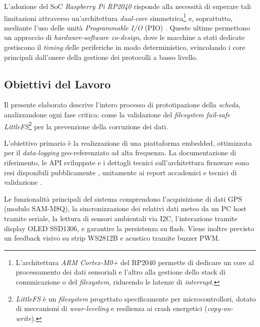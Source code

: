 L'adozione del SoC \textit{Raspberry Pi RP2040} \cite{rp2040_ds} risponde alla necessità di superare tali limitazioni attraverso un'architettura \textit{dual-core} simmetrica\footnote{L'architettura \textit{ARM Cortex-M0+} del RP2040 permette di dedicare un core al processamento dei dati sensoriali e l'altro alla gestione dello stack di comunicazione o del \textit{filesystem}, riducendo le latenze di \textit{interrupt}.} e, soprattutto, mediante l'uso delle unità \textit{Programmable I/O} (PIO) \cite{rp2040_paper}. Queste ultime permettono un approccio di \textit{hardware-software co-design}, dove le macchine a stati dedicate gestiscono il \textit{timing} delle periferiche in modo deterministico, svincolando i core principali dall'onere della gestione dei protocolli a basso livello.



\subsection{Obiettivi del Lavoro}
Il presente elaborato descrive l'intero processo di prototipazione della \textit{scheda}, analizzandone ogni fase critica: come la validazione del \textit{filesystem fail-safe LittleFS}\footnote{\textit{LittleFS} è un \textit{filesystem} progettato specificamente per microcontrollori, dotato di meccanismi di \textit{wear-leveling} e resilienza ai crash energetici (\textit{copy-on-write}).} per la prevenzione della corruzione dei dati.

L'obiettivo primario è la realizzazione di una piattaforma embedded, ottimizzata per il \textit{data-logging} geo-referenziato ad alta frequenza. La documentazione di riferimento, le API sviluppate e i dettagli tecnici sull'architettura firmware sono resi disponibili pubblicamente \cite{ppse_api, ppse_homepage, ppse_github}, unitamente ai report accademici e tecnici di validazione \cite{ppse_academic_report, ppse_technical_ref}. 



Le funzionalità principali del sistema comprendono l'acquisizione di
dati GPS (modulo SAM-M8Q), la sincronizzazione dei relativi dati meteo da un PC host tramite seriale, la lettura di sensori ambientali via
I2C, l'interazione tramite display OLED SSD1306, e garantire la persistenza
su flash. Viene inoltre previsto un feedback visivo su strip WS2812B e acustico tramite buzzer PWM.
